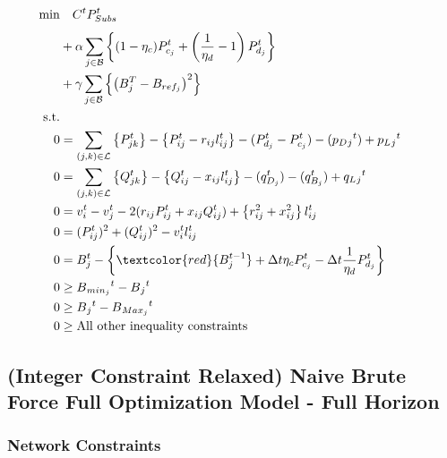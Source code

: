 \begin{gather}
	\begin{align}
		\min_{
		} 
		\vspace{-15ex} %
		& \quad
		C^t P_{Subs}^t \\
		&+ \alpha \sum_{j \in \mathcal{B}} \left\{ (1- \eta_c)P_{c_j}^t + \left(\frac{1}{\eta_d}-1\right) P_{d_j}^t \right\} \nonumber\\
		&+ \gamma \sum_{j \in \mathcal{B}} \left\{ \left(B^{T}_{j} - B_{ref_{j}}\right)^2\right\} \nonumber\\
		\text{s.t.} & {}\nonumber\\
		{0} & = {\sum_{(j, k) \in \mathcal{L}} \left\{P_{jk}^t\right\} - \left\{P_{ij}^t - r_{ij}l_{ij}^t\right\} - (P_{d_j}^t - P_{c_j}^t)  - (p_D{_j}^t) + p_L{_j}^t} && \\
		{0} & = {\sum_{(j, k) \in \mathcal{L}} \left\{Q_{jk}^t\right\} - \left\{Q_{ij}^t - x_{ij}l_{ij}^t\right\} - (q_{D_j}^t) - (q_{B_j}^t) + q_L{_j}^t} && \\
		{0} & = {v_{i}^t - v_{j}^t - 2(r_{ij}P_{ij}^t + x_{ij}Q_{ij}^t) + \left\{r_{ij}^2 + x_{ij}^2\right\}l_{ij}^t}  && \\
		{0} & = {(P_{ij}^{t})^2 + (Q_{ij}^{t})^2 - v_{i}^t l_{ij}^t } \\
		{0} & = {B_{j}^{t} - \left\{ \textcolor{red}{ B_{j}^{t-1} } + \Delta t  \eta_c P_{c_j}^t - \Delta t\frac{1}{\eta_d} P_{d_j}^t \right\} } \\
		{0} & \geq {B{_{min_{j}}}^t - B{_j}^t} \\
		{0} & \geq {B{_j}^t - B{_{Max_{j}}}^t} \\
		{0} & \geq {\text{All other inequality constraints}}
	\end{align}
\end{gather}

\subsection*{(Integer Constraint Relaxed) Naive Brute Force Full Optimization Model - Full Horizon}

\subsubsection*{Network Constraints}

